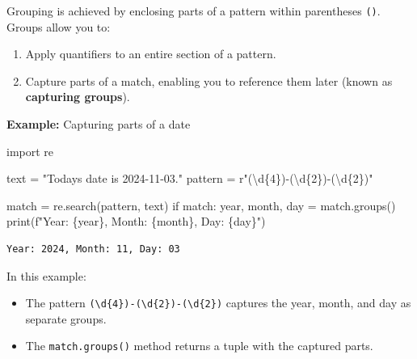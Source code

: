 \documentclass[
  letterpaper,
  DIV=11,
  numbers=noendperiod]{scrreprt}
\newenvironment{Shaded}{\begin{snugshade}}{\end{snugshade}}
\newcommand{\BuiltInTok}[1]{\textcolor[rgb]{0.00,0.23,0.31}{#1}}
\newcommand{\ControlFlowTok}[1]{\textcolor[rgb]{0.00,0.23,0.31}{#1}}
\newcommand{\ImportTok}[1]{\textcolor[rgb]{0.00,0.46,0.62}{#1}}
\newcommand{\NormalTok}[1]{\textcolor[rgb]{0.00,0.23,0.31}{#1}}
\newcommand{\OperatorTok}[1]{\textcolor[rgb]{0.37,0.37,0.37}{#1}}
\newcommand{\SpecialCharTok}[1]{\textcolor[rgb]{0.37,0.37,0.37}{#1}}
\newcommand{\SpecialStringTok}[1]{\textcolor[rgb]{0.13,0.47,0.30}{#1}}
\newcommand{\StringTok}[1]{\textcolor[rgb]{0.13,0.47,0.30}{#1}}
\newcommand{\VerbatimStringTok}[1]{\textcolor[rgb]{0.13,0.47,0.30}{#1}}
\providecommand{\tightlist}{%
  \setlength{\itemsep}{0pt}\setlength{\parskip}{0pt}}\usepackage{longtable,booktabs,array}
\begin{document}
Grouping is achieved by enclosing parts of a pattern within parentheses
\texttt{()}. Groups allow you to:

\begin{enumerate}
\def\labelenumi{\arabic{enumi}.}
\tightlist
\item
  Apply quantifiers to an entire section of a pattern.
\item
  Capture parts of a match, enabling you to reference them later (known
  as \textbf{capturing groups}).
\end{enumerate}

\textbf{Example:} Capturing parts of a date

\begin{Shaded}
\begin{Highlighting}[]
\ImportTok{import}\NormalTok{ re}

\NormalTok{text }\OperatorTok{=} \StringTok{"Today\textquotesingle{}s date is 2024{-}11{-}03."}
\NormalTok{pattern }\OperatorTok{=} \VerbatimStringTok{r"(\textbackslash{}d}\SpecialCharTok{\{4\}}\VerbatimStringTok{){-}(\textbackslash{}d}\SpecialCharTok{\{2\}}\VerbatimStringTok{){-}(\textbackslash{}d}\SpecialCharTok{\{2\}}\VerbatimStringTok{)"}

\NormalTok{match }\OperatorTok{=}\NormalTok{ re.search(pattern, text)}
\ControlFlowTok{if}\NormalTok{ match:}
\NormalTok{    year, month, day }\OperatorTok{=}\NormalTok{ match.groups()}
    \BuiltInTok{print}\NormalTok{(}\SpecialStringTok{f"Year: }\SpecialCharTok{\{}\NormalTok{year}\SpecialCharTok{\}}\SpecialStringTok{, Month: }\SpecialCharTok{\{}\NormalTok{month}\SpecialCharTok{\}}\SpecialStringTok{, Day: }\SpecialCharTok{\{}\NormalTok{day}\SpecialCharTok{\}}\SpecialStringTok{"}\NormalTok{)  }
\end{Highlighting}
\end{Shaded}

\begin{verbatim}
Year: 2024, Month: 11, Day: 03
\end{verbatim}

In this example:

\begin{itemize}
\tightlist
\item
  The pattern
  \texttt{(\textbackslash{}d\{4\})-(\textbackslash{}d\{2\})-(\textbackslash{}d\{2\})}
  captures the year, month, and day as separate groups.
\item
  The \texttt{match.groups()} method returns a tuple with the captured
  parts.
\end{itemize}
\end{document}
